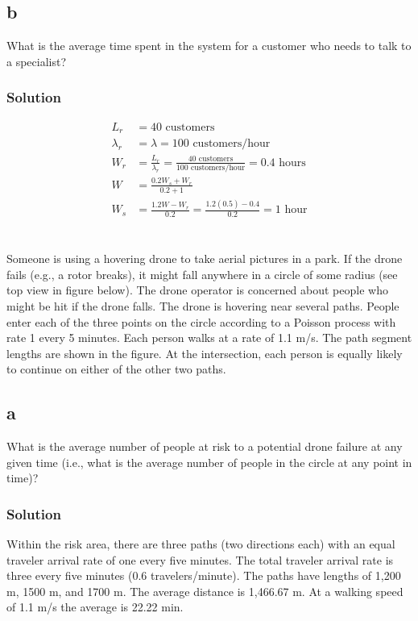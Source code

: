 \documentclass{amsart}
\begin{document}
\subsection*{b}
What is the average time spent in the system for a customer who needs to talk to
a specialist?
\subsubsection*{Solution}
\begin{align}
  L_r &= 40\text{ customers} \\
  \lambda_r &= \lambda = 100 \text{ customers/hour}\\
  W_r &= \frac{L_r}{\lambda_r} =\frac{40\text{ customers}}{100\text{ customers/hour}}
        =0.4\text{ hours} \\
  W &= \frac{0.2W_s + W_r}{0.2+1} \\
  W_s &= \frac{1.2W-W_r}{0.2} = \frac{1.2(0.5)-0.4}{0.2} = 1\text{ hour}
\end{align}

\section{} %
Someone is using a hovering drone to take aerial pictures in a park. If the drone fails
(e.g., a rotor breaks), it might fall anywhere in a circle of some radius (see top view in
figure below). The drone operator is concerned about people who might be hit if the
drone falls. The drone is hovering near several paths. People enter each of the three
points on the circle according to a Poisson process with rate 1 every 5 minutes. Each
person walks at a rate of 1.1 m/s. The path segment lengths are shown in the figure. At
the intersection, each person is equally likely to continue on either of the other two paths.

\subsection*{a}
What is the average number of people at risk to a potential drone failure at any given
time (i.e., what is the average number of people in the circle at any point in time)?
\subsubsection*{Solution}
Within the risk area, there are three paths (two directions each) with an equal
traveler arrival rate of one every five minutes. The total traveler arrival rate
is three every five minutes (0.6 travelers/minute). The paths have lengths of 1,200 m, 1500
m, and 1700 m. The average distance is 1,466.67 m. At a walking speed of 1.1 m/s
the average is 22.22 min.
\end{document}
